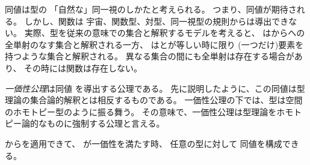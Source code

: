 \documentclass[index]{subfiles}
\begin{document}

同値は型の
「自然な」同一視のしかたと考えられる。
つまり、同値が期待される。
しかし、関数は
宇宙、関数型、対型、同一視型の規則からは導出できない。
実際、型を従来の意味での集合と解釈するモデルを考えると、
はからへの
全単射のなす集合と解釈される一方、
はとが等しい時に限り
(一つだけ)要素を持つような集合と解釈される。
異なる集合の間にも全単射は存在する場合があり、
その時には関数は存在しない。

\emph{一価性公理}は同値
を導出する公理である。
先に説明したように、この同値は型理論の集合論的解釈とは相反するものである。
一価性公理の下では、型は空間のホモトピー型のように振る舞う。
その意味で、一価性公理は型理論をホモトピー論的なものに強制する公理と言える。




からを適用できて、
が一価性を満たす時、
任意の型に対して
同値を構成できる。


\end{document}

